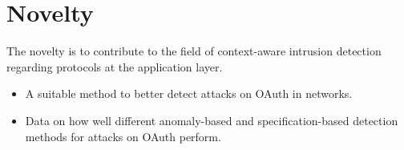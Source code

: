 \documentclass{article}
\begin{document}
\section{Novelty}
The novelty is to contribute to the field of context-aware intrusion detection regarding protocols at the application layer.
\begin{itemize}
    \item A suitable method to better detect attacks on OAuth in networks.
    \item Data on how well different anomaly-based and specification-based detection methods for attacks on OAuth perform.
\end{itemize}




\end{document}
